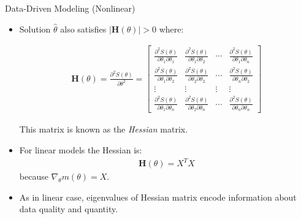 \documentclass[9pt]{beamer}
\begin{document}
%
\begin{frame}{Data-Driven Modeling (Nonlinear)}

\begin{itemize}
\item Solution $\hat{\theta}$ also satisfies $|\mathbf{H}({\theta})|>0$ where:
\begin{footnotesize}
\begin{align*}
\mathbf{H}(\theta)=\frac{\partial^2 S(\theta)}{\partial \theta^2}=
\left[\begin{array}{ccccccccc}
\frac{\partial^2 S(\theta)}{\partial \theta_1\partial \theta_1}&\frac{\partial^2 S(\theta)}{\partial \theta_1\partial \theta_2}&\cdots& \frac{\partial^2 S(\theta)}{\partial \theta_1\partial \theta_n}\\
\frac{\partial^2 S(\theta)}{\partial \theta_1\partial \theta_2}&\frac{\partial^2 S(\theta)}{\partial \theta_2\partial \theta_2}&\cdots&\frac{\partial^2 S(\theta)}{\partial \theta_n\partial \theta_2}\\
\vdots & \vdots &\vdots &\vdots\\
\frac{\partial^2 S(\theta)}{\partial \theta_1\partial \theta_n}&\frac{\partial^2 S(\theta)}{\partial \theta_2\partial \theta_n}&\cdots& \frac{\partial^2 S(\theta)}{\partial \theta_n\partial \theta_n}
\end{array}\right]
\end{align*}
\end{footnotesize}
This matrix is known as the {\em Hessian} matrix. 
\item For linear models the Hessian is:
\begin{align*}
\mathbf{H}(\theta)=X^TX
\end{align*}
because  $\nabla_\theta m(\theta)=X$.  
\item As in linear case, eigenvalues of Hessian matrix encode information about data quality and quantity. 
\end{itemize}
\end{frame}
\end{document}
